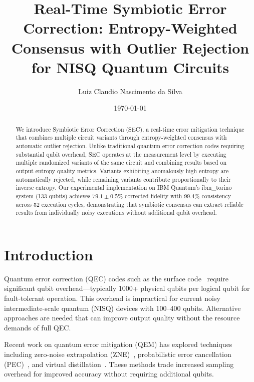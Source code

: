 \documentclass[twocolumn,preprintnumbers,amsmath,amssymb,prl]{revtex4-2}
\begin{document}
\title{Real-Time Symbiotic Error Correction: Entropy-Weighted Consensus with Outlier Rejection for NISQ Quantum Circuits}

\author{Luiz Claudio Nascimento da Silva}

\date{\today}

\begin{abstract}
We introduce Symbiotic Error Correction (SEC), a real-time error mitigation technique that combines multiple circuit variants through entropy-weighted consensus with automatic outlier rejection. Unlike traditional quantum error correction codes requiring substantial qubit overhead, SEC operates at the measurement level by executing multiple randomized variants of the same circuit and combining results based on output entropy quality metrics. Variants exhibiting anomalously high entropy are automatically rejected, while remaining variants contribute proportionally to their inverse entropy. Our experimental implementation on IBM Quantum's ibm\_torino system (133 qubits) achieves $79.1 \pm 0.5\%$ corrected fidelity with $99.4\%$ consistency across 52 execution cycles, demonstrating that symbiotic consensus can extract reliable results from individually noisy executions without additional qubit overhead.
\end{abstract}

\maketitle

\section{Introduction}

Quantum error correction (QEC) codes such as the surface code~\cite{fowler2012surface} require significant qubit overhead---typically 1000+ physical qubits per logical qubit for fault-tolerant operation. This overhead is impractical for current noisy intermediate-scale quantum (NISQ) devices with 100--400 qubits. Alternative approaches are needed that can improve output quality without the resource demands of full QEC.

Recent work on quantum error mitigation (QEM) has explored techniques including zero-noise extrapolation (ZNE)~\cite{temme2017error}, probabilistic error cancellation (PEC)~\cite{endo2018practical}, and virtual distillation~\cite{koczor2021exponential}. These methods trade increased sampling overhead for improved accuracy without requiring additional qubits.
\end{document}
